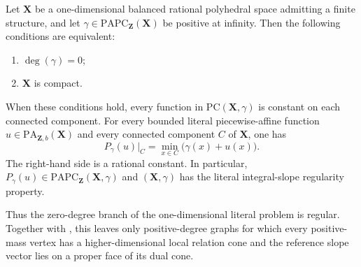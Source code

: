 
\begin{theorem}
\label{thm:frontier-polyhedral-zero-degree-integral-regularity}
Let $\mathbf X$ be a one-dimensional balanced rational polyhedral space
admitting a finite structure, and let
$\gamma\in\mathrm{PAPC}_{\mathbf Z}(\mathbf X)$ be positive at infinity.
Then the following conditions are equivalent:
\begin{enumerate}
\item $\deg(\gamma)=0$;
\item $\mathbf X$ is compact.
\end{enumerate}
When these conditions hold, every function in
$\mathrm{PC}(\mathbf X,\gamma)$ is constant on each connected component.
For every bounded literal piecewise-affine function
$u\in\mathrm{PA}_{\mathbf Z,b}(\mathbf X)$ and every connected component
$C$ of $\mathbf X$, one has
\begin{equation}
 P_\gamma(u)|_C
   =\min_{x\in C}\bigl(\gamma(x)+u(x)\bigr).
 \label{eq:frontier-polyhedral-zero-degree-envelope}
\end{equation}
The right-hand side is a rational constant.  In particular,
$P_\gamma(u)\in\mathrm{PAPC}_{\mathbf Z}(\mathbf X,\gamma)$ and
$(\mathbf X,\gamma)$ has the literal integral-slope regularity property.
\end{theorem}

Thus the zero-degree branch of the one-dimensional literal problem is
regular.  Together with
, this
leaves only positive-degree graphs for which every positive-mass vertex has
a higher-dimensional local relation cone and the reference slope vector lies
on a proper face of its dual cone.
